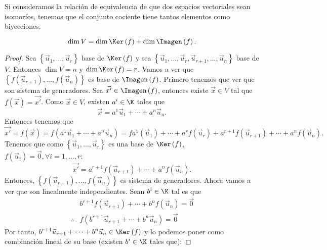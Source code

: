 \begin{observation}
\normalfont Si consideramos la relación de equivalencia de que dos espacios vectoriales sean isomorfos, tenemos que el conjunto cociente tiene tantos elementos como biyecciones.
\end{observation}

\begin{ftheorem}[]
\normalfont 
\[\dim V = \dim \Ker\left(f\right) + \dim \Imagen\left(f\right) .\]
\end{ftheorem}
\begin{proof}
	Sea $\displaystyle \left\{ \vec{u}_{1}, \ldots, \vec{u}_{r}\right\}  $ base de $\displaystyle \Ker\left(f\right) $ y sea $\displaystyle \left\{ \vec{u}_{1}, \ldots, \vec{u}_{r}, \vec{u}_{r+1}, \ldots, \vec{u}_{n}\right\}  $ base de $\displaystyle V $. Entonces $\displaystyle \dim V = n $ y $\displaystyle \dim \Ker\left(f\right) = r $. Vamos a ver que $\displaystyle \left\{ f\left(\vec{u}_{r+1}\right), \ldots, f\left(\vec{u}_{n}\right)\right\}  $ es base de $\displaystyle \Imagen\left(f\right) $. Primero tenemos que ver que son sistema de generadores. Sea $\displaystyle \vec{x'} \in \Imagen\left(f\right) $, entonces existe $\displaystyle \vec{x} \in V $ tal que $\displaystyle f\left(\vec{x}\right) = \vec{x'} $. Como $\displaystyle \vec{x}\in V $, existen $\displaystyle a^{i}\in\K $ tales que
	\[ \vec{x} = a^{1}\vec{u}_{1} + \cdots + a^{n}\vec{u}_{n}.\]
Entonces tenemos que
\[\vec{x'} = f\left(\vec{x}\right) = f\left(a^{1}\vec{u}_{1} + \cdots + a^{n}\vec{u}_{n}\right) = fa^{1}\left(\vec{u}_{1}\right) + \cdots + a^{r}f\left(\vec{u}_{r}\right) + a^{r+1}f(\vec{u}_{r+1}) + \cdots + a^{n} f\left(\vec{u}_{n}\right) .\]
Tenemos que como $\displaystyle \left\{ \vec{u}_{1}, \ldots, \vec{u}_{r}\right\}  $ es una base de $\displaystyle \Ker\left(f\right) $, $\displaystyle f\left(\vec{u}_{i}\right) = \vec{0}, \forall i = 1, \ldots, r $:
\[\vec{x'} = a^{r+1}f\left(\vec{u}_{r+1}\right) + \cdots + a^{n}f\left(\vec{u}_{n}\right) .\]
Entonces, $\displaystyle \left\{ f(\vec{u}_{r+1}), \ldots, f(\vec{u}_{n})\right\}  $ es sistema de generadores. Ahora vamos a ver que son linealmente independientes. Sean $\displaystyle b^{i} \in \K $ tal es que 
\[
\begin{split}
  & b^{r+1}f\left(\vec{u}_{r+1}\right) + \cdots + b^{n}f\left(\vec{u}_{n}\right) = \vec{0} \\
 \therefore & f\left(b^{r+1}\vec{u}_{r+1} + \cdots + b^{n}\vec{u}_{n}\right) = \vec{0}
\end{split}
\]
Por tanto, $\displaystyle b^{r+1}\vec{u}_{r+1} + \cdots + b^{n}\vec{u}_{n} \in \Ker\left(f\right) $ y lo podemos poner como combinación lineal de su base (existen $\displaystyle b^{i}\in\K $ tales que):

\end{proof}
